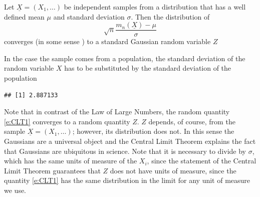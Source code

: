       \begin{theorem}
      	\label{t:CLT}
      	Let $\underline X = ( X_1 , \ldots )$ be independent samples from a distribution that has a well defined mean $\mu$ and standard deviation $\sigma$. Then the distribution of 
      	\begin{equation}
      		\label{e:CLT1}
      		\sqrt{n}\frac{ m_n(\underline X) - \mu }{\sigma } 
      	\end{equation}
      	converges (in some sense ) to a standard Gaussian random variable $Z$  
      \end{theorem}
     In the case the sample comes from a population, the standard deviation of the random variable $X$ has to be substituted by the standard deviation of the population 
\begin{knitrout}
\color{fgcolor}\begin{kframe}
\begin{alltt}
\end{alltt}
\begin{verbatim}
## [1] 2.887133
\end{verbatim}
\end{kframe}
\end{knitrout}
Note that in contrast of the Law of Large Numbers, the random quantity \eqref{e:CLT1} converges to a random quantity $Z$. $Z$ depends, of course, from the sample $\underline X = (X_1, \ldots )$; however, its distribution does not. In this sense the Gaussians are a universal object and the Central Limit Theorem explains the fact that Gaussians are ubiquitous in science. Note that it is necessary to divide by $\sigma$, which has the same units of measure of the $X_i$, since the statement of the Central Limit Theorem guarantees that $Z$ does not have units of measure, since the quantity \eqref{e:CLT1}  has the same distribution in the limit for any unit of measure we use. 
   
